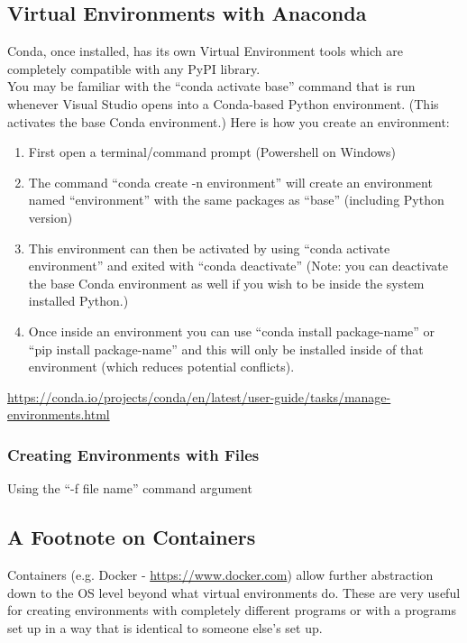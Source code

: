 \documentclass[12pt]{article}
\begin{document}
        \subsection{Virtual Environments with Anaconda}
            Conda, once installed, has its own Virtual Environment tools which are completely compatible with any PyPI library.
            \\You may be familiar with the ``conda activate base'' command that is run whenever Visual Studio opens into a Conda-based Python environment.
            (This activates the base Conda environment.)
            Here is how you create an environment:
            \begin{enumerate}
                \item First open a terminal/command prompt (Powershell on Windows)
                \item The command ``conda create -n environment'' will create an environment named ``environment'' with the same packages as ``base''  (including Python version)
                \item This environment can then be activated by using ``conda activate environment'' and exited with ``conda deactivate'' (Note: you can deactivate the base Conda environment as well if you wish to be inside the system installed Python.)
                \item Once inside an environment you can use “conda install \textlangle package-name\textrangle” or “pip install \textlangle package-name\textrangle” and this will only be installed inside of that environment (which reduces potential conflicts).
            \end{enumerate}
            \url{https://conda.io/projects/conda/en/latest/user-guide/tasks/manage-environments.html}
            \subsubsection{Creating Environments with Files}
                Using the ``-f \textlangle file name\textrangle'' command argument
        \subsection{A Footnote on Containers}
        Containers (e.g. Docker - \url{https://www.docker.com}) allow further abstraction down to the OS level beyond what virtual environments do.
        These are very useful for creating environments with completely different programs or with a programs set up in a way that is identical to someone else's set up.
\end{document}
